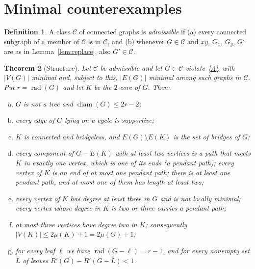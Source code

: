 \documentclass[11pt]{amsart}
\newtheorem{theorem}{Theorem}[section]
\theoremstyle{definition}
\newtheorem{definition}[theorem]{Definition}
\DeclareMathOperator{\rad}{rad}
\DeclareMathOperator{\diam}{diam}
\newcommand{\Rp}{R'}
\newcommand{\C}{\mathcal{C}}
\begin{document}
\section{Minimal counterexamples}\label{sec:structure}

\begin{definition}
A class $\C$ of connected graphs is \emph{admissible} if (a) every connected subgraph of a member of $\C$ is in $\C$,
and (b) whenever $G\in\C$ and $xy$, $G_x$, $G_y$, $G'$ are as in Lemma~\ref{lem:replace}, also $G'\in\C$.
\end{definition}

\begin{theorem}[Structure]\label{thm:structure}
Let $\C$ be admissible and let $G\in\C$ violate~\eqref{A}, with $|V(G)|$ minimal and, subject to this, $|E(G)|$
minimal among such graphs in $\C$. Put $r=\rad(G)$ and let $K$ be the $2$-core of $G$. Then:
\begin{enumerate}[(a)]
\item $G$ is not a tree and $\diam(G)\le2r-2$;
\item every edge of $G$ lying on a cycle is supportive;
\item $K$ is connected and bridgeless, and $E(G)\setminus E(K)$ is the set of bridges of $G$;
\item every component of $G-E(K)$ with at least two vertices is a path that meets $K$ in exactly one vertex, which is
one of its ends (a \emph{pendant path}); every vertex of $K$ is an end of at most one pendant path; there is at least one
pendant path, and at most one of them has length at least two;
\item every vertex of $K$ has degree at least three in $G$ and is not locally minimal; every vertex whose degree in
$K$ is two or three carries a pendant path;
\item at most three vertices have degree two in $K$; consequently $|V(K)|\le2\mu(K)+1=2\mu(G)+1$;
\item for every leaf $\ell$ we have $\rad(G-\ell)=r-1$, and for every nonempty set $L$ of leaves
$\Rp(G)-\Rp(G-L)<1$.
\end{enumerate}
\end{theorem}
\end{document}
